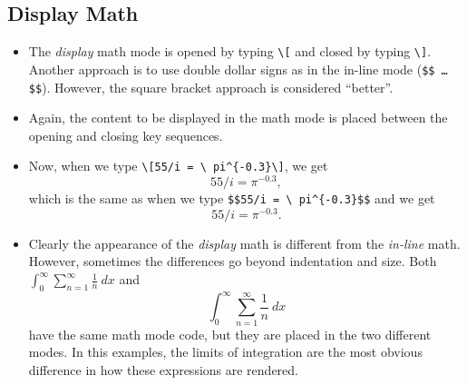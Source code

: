 \subsection*{Display Math}
\begin{itemize}
\item The \textit{display} math mode is opened by typing
  \texttt{\textbackslash [} and closed by typing
  \texttt{\textbackslash ]}. Another approach is to use double dollar
  signs as in the in-line mode (\texttt{\$\$ \ldots \$\$}). However,
  the square bracket approach is considered ``better''.

\item Again, the content to be displayed in the math mode is placed
  between the opening and closing key sequences.
\item Now, when we type \texttt{\textbackslash [55/i = \textbackslash
    pi\^{}\{-0.3\}\textbackslash ]}, we get
  \[
  55/i = \pi^{-0.3},
  \]
  which is the same as when we type \texttt{\$\$55/i = \textbackslash
    pi\^{}\{-0.3\}\$\$} and we get
  $$
  55/i = \pi^{-0.3}.
  $$
\item Clearly the appearance of the \textit{display} math is different
  from the \textit{in-line} math. However, sometimes the differences
  go beyond indentation and size. Both $\int_{0}^{\infty}
  \sum_{n=1}^{\infty} \frac{1}{n}~dx$ and 
\[
\int_{0}^{\infty} \sum_{n=1}^{\infty} \frac{1}{n}~dx
\]
have the same math mode code, but they are placed in the two different
modes. In this examples, the limits of integration are the most
obvious difference in how these expressions are rendered.
\end{itemize}


